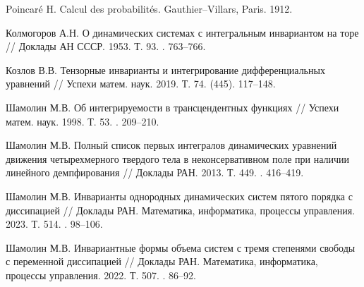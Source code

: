\begin{thebibliography}{9} %
{Poincar\'{e} H.}
Calcul des probabilit\'{e}s. Gauthier--Villars, Paris. 1912. %

{Колмогоров А.Н.}
О динамических системах с интегральным инвариантом на торе 
// Доклады АН СССР. 1953. Т. 93. . 763--766.

{Козлов В.В.}
Тензорные инварианты и интегрирование дифференциальных
уравнений // Успехи матем. наук. 2019. Т. 74. (445). 117--148.

{Шамолин М.В.}
Об интегрируемости в трансцендентных функциях // Успехи матем. наук. 1998. Т. 53. . 209--210.

{Шамолин М.В.}
Полный список первых интегралов динамических уравнений движения четырехмерного твердого тела в неконсервативном поле при наличии линейного демпфирования
// Доклады РАН. 2013. Т. 449. . 416--419.

{Шамолин М.В.}
Инварианты однородных динамических систем пятого порядка с диссипацией
// Доклады РАН. Математика, информатика, процессы управления. 2023. Т. 514. . 98--106.

{Шамолин М.В.}
Инвариантные формы объема систем с тремя степенями свободы с переменной диссипацией
// Доклады РАН. Математика, информатика, процессы управления. 2022. Т. 507. . 86--92.
\end{thebibliography}





%
